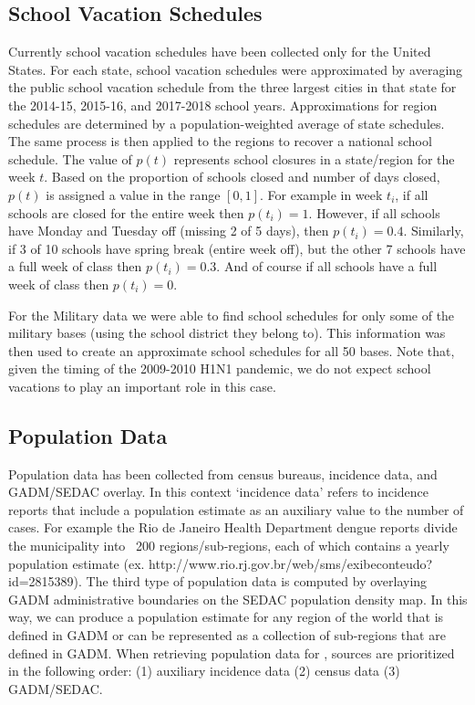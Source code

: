 \documentclass[a4paper]{article}
\begin{document}
\subsection{School Vacation Schedules}
Currently school vacation schedules have been collected only for the United States.  For each state, school vacation schedules were approximated by averaging the public school vacation schedule from the three largest cities in that state for the 2014-15, 2015-16, and 2017-2018 school years.  Approximations for region schedules are determined by a population-weighted average of state schedules.  The same process is then applied to the regions to recover a national school schedule.  The value of $p(t)$ represents school closures in a state/region for the week $t$. Based on the proportion of schools closed and number of days closed, $p(t)$ is assigned a value in the range $[0,1]$.  For example in week $t_i$, if all schools are closed for the entire week then $p(t_i)=1$.  However, if all schools have Monday and Tuesday off (missing 2 of 5 days), then  $p(t_i)=0.4$.  Similarly, if 3 of 10 schools have spring break (entire week off), but the other 7 schools have a full week of class then $p(t_i)=0.3$.  And of course if all schools have a full week of class then $p(t_i)=0$.

For the Military data we were able to find school schedules for only some of the military bases (using the school district they belong to). This information was then used to create an approximate school schedules for all 50 bases.  Note that, given the timing of the 2009-2010 H1N1 pandemic, we do not expect school vacations to play an important role in this case.


\subsection{Population Data}
Population data has been collected from census bureaus, incidence data, and GADM/SEDAC overlay.  In this context `incidence data' refers to incidence reports that include a population estimate as an auxiliary value to the number of cases.  For example the Rio de Janeiro Health Department dengue reports divide the municipality into ~200 regions/sub-regions, each of which contains a yearly population estimate (ex. http://www.rio.rj.gov.br/web/sms/exibeconteudo?id=2815389).  The third type of population data is computed by overlaying GADM administrative boundaries on the SEDAC population density map.  In this way, we can produce a population estimate for any region of the world that is defined in GADM or can be represented as a collection of sub-regions that are defined in GADM. When retrieving population data for , sources are prioritized in the following order: (1) auxiliary incidence data (2) census data (3) GADM/SEDAC.
\end{document}
